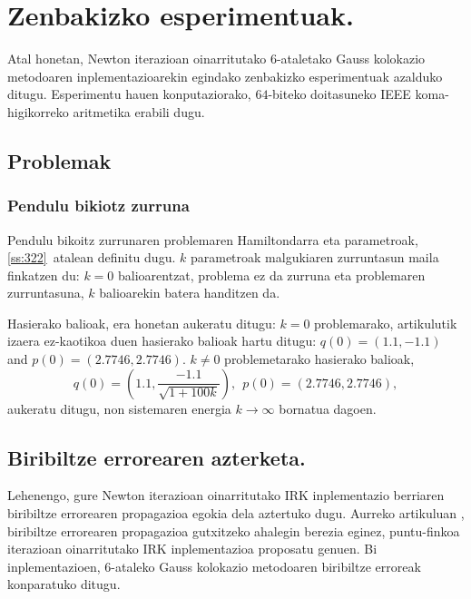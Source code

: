 \clearpage

\section{Zenbakizko esperimentuak.}

\label{s:ne}


Atal honetan, Newton iterazioan oinarritutako $6$-ataletako Gauss kolokazio metodoaren inplementazioarekin egindako zenbakizko esperimentuak azalduko ditugu. Esperimentu hauen konputaziorako, $64$-biteko doitasuneko IEEE koma-higikorreko aritmetika erabili dugu.

\subsection{Problemak}

\subsubsection*{Pendulu bikiotz zurruna}

Pendulu bikoitz zurrunaren problemaren Hamiltondarra eta parametroak, \ref{ss:322}~atalean definitu dugu. $k$ parametroak malgukiaren zurruntasun maila finkatzen du: $k=0$ balioarentzat, problema ez da zurruna eta problemaren zurruntasuna, $k$ balioarekin batera handitzen da. 

Hasierako balioak, era honetan aukeratu ditugu: $k=0$ problemarako, \cite{Dumitru} artikulutik izaera ez-kaotikoa duen hasierako balioak hartu ditugu: $q(0)=(1.1, -1.1)$ and $p(0)=(2.7746,2.7746)$. $k\neq 0$ problemetarako hasierako balioak,
\begin{equation*}
q(0)=\left(1.1, \frac{-1.1}{\sqrt{1+100k}}\right), \ \ 
p(0)=(2.7746,2.7746),
\end{equation*}
aukeratu ditugu, non sistemaren energia $k \rightarrow \infty$ bornatua dagoen.


\subsection{Biribiltze errorearen azterketa.}

Lehenengo, gure Newton iterazioan oinarritutako IRK inplementazio berriaren biribiltze errorearen propagazioa egokia dela aztertuko dugu. Aurreko artikuluan \cite{Antonana2017},  biribiltze errorearen propagazioa gutxitzeko ahalegin berezia eginez,  puntu-finkoa iterazioan oinarritutako IRK inplementazioa proposatu genuen. Bi inplementazioen, 6-ataleko Gauss kolokazio metodoaren  biribiltze erroreak konparatuko ditugu.

